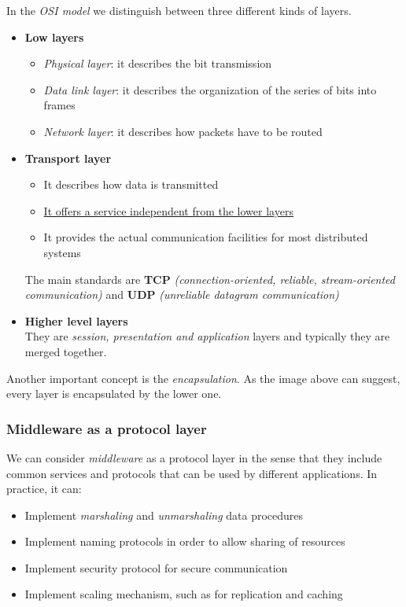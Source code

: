 In the \textit{OSI model} we distinguish between three different kinds of layers.
\begin{itemize}
    \item \textbf{Low layers}
        \begin{itemize}
            \item \textit{Physical layer}: it describes the bit transmission
            \item \textit{Data link layer}: it describes the organization of the series of bits into frames
            \item \textit{Network layer}: it describes how packets have to be routed
        \end{itemize}
    \item \textbf{Transport layer}
        \begin{itemize}
            \item It describes how data is transmitted
            \item \underline{It offers a service independent from the lower layers}
            \item It provides the actual communication facilities for most distributed systems
        \end{itemize}
        The main standards are \textbf{TCP} \textit{(connection-oriented, reliable, stream-oriented communication)} and \textbf{UDP} \textit{(unreliable datagram communication)}
    \item \textbf{Higher level layers}\\
        They are \textit{session, presentation and application} layers and typically they are merged together.
\end{itemize}
Another important concept is the \textit{encapsulation}. As the image above can suggest, every layer is encapsulated by the lower one.

\subsubsection{Middleware as a protocol layer}
We can consider \textit{middleware} as a protocol layer in the sense that they include common services and protocols that can be used by different applications. In practice, it can:
\begin{itemize}
    \item Implement \textit{marshaling} and \textit{unmarshaling} data procedures
    \item Implement naming protocols in order to allow sharing of resources
    \item Implement security protocol for secure communication
    \item Implement scaling mechanism, such as for replication and caching
\end{itemize}

